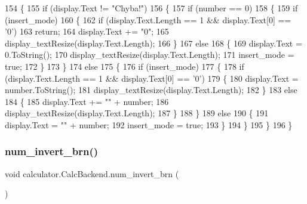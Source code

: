 \begin{DoxyCode}
154         \{
155             \textcolor{keywordflow}{if} (display.Text != \textcolor{stringliteral}{"Chyba!"})
156             \{
157                 \textcolor{keywordflow}{if} (number == 0)
158                 \{
159                     \textcolor{keywordflow}{if} (insert\_mode)
160                     \{
162                         \textcolor{keywordflow}{if} (display.Text.Length == 1 && display.Text[0] == \textcolor{charliteral}{'0'}) 
163                             \textcolor{keywordflow}{return};
164                         display.Text += \textcolor{stringliteral}{"0"};
165                         display\_textResize(display.Text.Length);
166                     \}
167                     \textcolor{keywordflow}{else}
168                     \{
169                         display.Text = 0.ToString();
170                         display\_textResize(display.Text.Length);
171                         insert\_mode = \textcolor{keyword}{true};
172                     \}
173                 \}
174                 \textcolor{keywordflow}{else}
175                 \{
176                     \textcolor{keywordflow}{if} (insert\_mode)
177                     \{
178                         \textcolor{keywordflow}{if} (display.Text.Length == 1 && display.Text[0] == \textcolor{charliteral}{'0'})
179                         \{
180                             display.Text = number.ToString();
181                             display\_textResize(display.Text.Length);
182                         \}
183                         \textcolor{keywordflow}{else}
184                         \{
185                             display.Text += \textcolor{stringliteral}{""} + number;
186                             display\_textResize(display.Text.Length);
187                         \}
188                     \}
189                     \textcolor{keywordflow}{else}
190                     \{
191                         display.Text = \textcolor{stringliteral}{""} + number;
192                         insert\_mode = \textcolor{keyword}{true};
193                     \}
194                 \}
195             \}
196         \}
\end{DoxyCode}
\mbox{\label{classcalculator_1_1_calc_backend_abf1777c457b96f9f357d92ead1876e8a}} 
\subsubsection{num\+\_\+invert\+\_\+brn()}
{\footnotesize\ttfamily void calculator.\+Calc\+Backend.\+num\+\_\+invert\+\_\+brn (\begin{DoxyParamCaption}{ }\end{DoxyParamCaption})}



